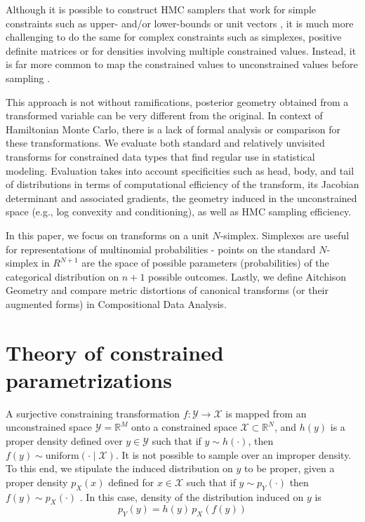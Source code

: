 \documentclass[11pt]{article}
\begin{document}
Although it is possible to construct HMC samplers that work for simple constraints such as upper- and/or lower-bounds \cite{neal2011mcmc} or unit vectors \cite{byrne2013geodesic}, it is much more challenging to do the same for complex constraints such as simplexes, positive definite matrices or for densities involving multiple constrained values.  Instead, it is far more common to map the constrained values to unconstrained values before sampling \cite{JSSv076i01, radul2021base, fjelde2020bijectors}.

This approach is not without ramifications, posterior geometry obtained from a transformed variable can be very different from the original. In context of Hamiltonian Monte Carlo, there is a lack of formal analysis or comparison for these transformations.  We evaluate both standard and relatively unvisited transforms for constrained data types that find regular use in statistical modeling. Evaluation takes into account specificities such as head, body, and tail of distributions in terms of computational efficiency of the transform, its Jacobian determinant and associated gradients, the geometry induced in the unconstrained space (e.g., log convexity and conditioning), as well as HMC sampling efficiency.

In this paper, we focus on transforms on a unit $N$-simplex. Simplexes are useful for representations of multinomial probabilities - points on the standard $N$-simplex in $R^{N+1}$ are the space of possible parameters (probabilities) of the categorical distribution on $n+1$ possible outcomes. Lastly, we define Aitchison Geometry and compare metric distortions of canonical transforms (or their augmented forms) in Compositional Data Analysis.
\section{Theory of constrained parametrizations}

A surjective constraining transformation $f : \mathcal{Y} \rightarrow \mathcal{X}$ is mapped from an unconstrained space $\mathcal{Y} = \mathbb{R}^M$ onto a constrained space $\mathcal{X} \subset \mathbb{R}^N$, and $h(y)$ is a proper density defined over $y \in \mathcal{Y}$ such that if $y \sim h(\cdot)$, then $f(y) \sim \textrm{uniform}(\cdot \mid \mathcal{X})$.  It is not possible to sample over an improper density.  To this end, we stipulate the induced distribution on $y$ to be proper, given a proper density $p_X(x)$ defined for $x \in \mathcal{X}$ such that if $y \sim p_Y(\cdot)$ then $f(y) \sim p_X(\cdot)$ . In this case, density of the distribution induced on $y$ is 
\[
p_Y(y) = h(y) \, p_X(f(y))
\]
\end{document}
